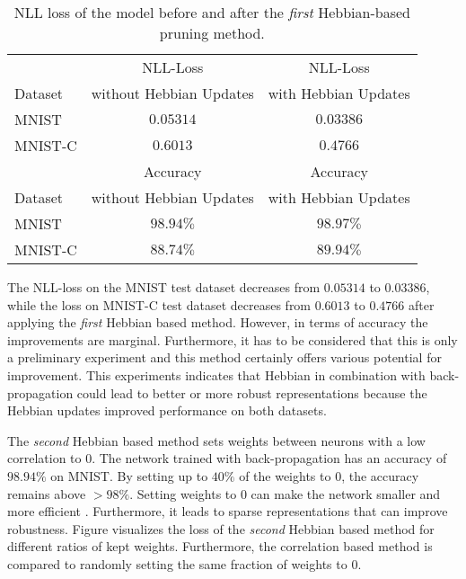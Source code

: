 \begin{table}[h] 
    \centering
	 \begin{tabular}{|l c c|} 
    	\hline
    	 & NLL-Loss & NLL-Loss \\
        Dataset & without Hebbian Updates & with Hebbian Updates\\
        \hline
        MNIST & \(0.05314\) & \(0.03386\) \\
        MNIST-C & \(0.6013\) & \(0.4766\) \\
        \hline
    	 &Accuracy & Accuracy \\
        Dataset & without Hebbian Updates & with Hebbian Updates\\
        \hline
        MNIST & \(98.94\%\) & \(98.97\%\) \\
        MNIST-C & \(88.74\%\) & \(89.94\%\) \\
        \hline
    \end{tabular}
    \caption[NLL Loss of Hebbian Pruning Network]{NLL loss of the model before and after the \emph{first} Hebbian-based pruning method.}
\end{table}

The NLL-loss on the MNIST test dataset decreases from \(0.05314\) to \(0.03386\), while the loss on MNIST-C test dataset decreases from \(0.6013\) to \(0.4766\) after applying the \emph{first} Hebbian based method.
However, in terms of accuracy the improvements are marginal.
Furthermore, it has to be considered that this is only a preliminary experiment and this method certainly offers various potential for improvement.
This experiments indicates that Hebbian in combination with back-propagation could lead to better or more robust representations because the Hebbian updates improved performance on both datasets.

The \emph{second} Hebbian based method sets weights between neurons with a low correlation to \(0\).
The network trained with back-propagation has an accuracy of \(98.94\%\) on MNIST.
By setting up to \(40\%\) of the weights to \(0\), the accuracy remains above \(>98\%\).
Setting weights to \(0\) can make the network smaller and more efficient .
Furthermore, it leads to sparse representations that can improve robustness.
Figure  visualizes the loss of the \emph{second} Hebbian based method for different ratios of kept weights.
Furthermore, the correlation based method is compared to randomly setting the same fraction of weights to \(0\).


